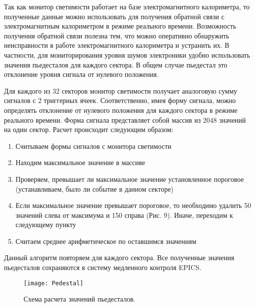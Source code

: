   Так как монитор светимости работает на базе электромагнитного калориметра, то полученные данные можно использовать для получения обратной связи с электромагнитным калориметром в режиме реального времени. Возможность получения обратной связи полезна тем, что можно оперативно обнаружить неисправности в работе электромагнитного калориметра и устранить их. В частности, для мониторирования уровня шумов электроники удобно использовать значения пьедесталов для каждого сектора. В общем случае пьедестал это отклонение уровня сигнала от нулевого положения.\par
  Для каждого из 32 секторов монитор светимости получает аналоговую сумму сигналов с 2 триггерных ячеек. Соответственно, имея форму сигнала, можно определять отклонение от нулевого положения для каждого сектора в режиме реального времени. Форма сигнала представляет собой массив из 2048 значений на один сектор. Расчет происходит следующим образом:
\begin{enumerate}
  \item Считываем формы сигналов с монитора светимости
  \item Находим максимальное значение в массиве
  \item Проверяем, превышает ли максимальное значение установленное пороговое (устанавливаем, было ли событие в данном секторе)
  \item Если максимальное значение превышает пороговое, то необходимо удалить 50 значений слева от максимума и 150 справа (Рис. 9). Иначе, переходим к следующему пункту
  \item Считаем среднее арифметическое по оставшимся значениям
\end{enumerate}
Данный алгоритм повторяем для каждого сектора. Все полученные значения пьедесталов сохраняются в систему медленного контроля EPICS.
\begin{figure}[htp]
  \centering
  \texttt{[image: Pedestal]}
  \caption{Схема расчета значений пьедесталов.}
  \label{fig:galaxy}
\end{figure}
